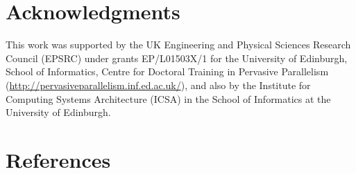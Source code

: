 \documentclass[preprint,12pt]{elsarticle}
\theoremstyle{plain}
\begin{document}



%

\section*{Acknowledgments}


This work was supported by the UK Engineering
and Physical Sciences Research Council (EPSRC) under grants
EP/L01503X/1 for the University of Edinburgh, School
of Informatics, Centre for Doctoral Training in Pervasive
Parallelism (\url{http://pervasiveparallelism.inf.ed.ac.uk/}),
and also by the Institute for Computing Systems Architecture (ICSA)
in the School of Informatics at the University of Edinburgh.

\section*{References}


\end{document}
